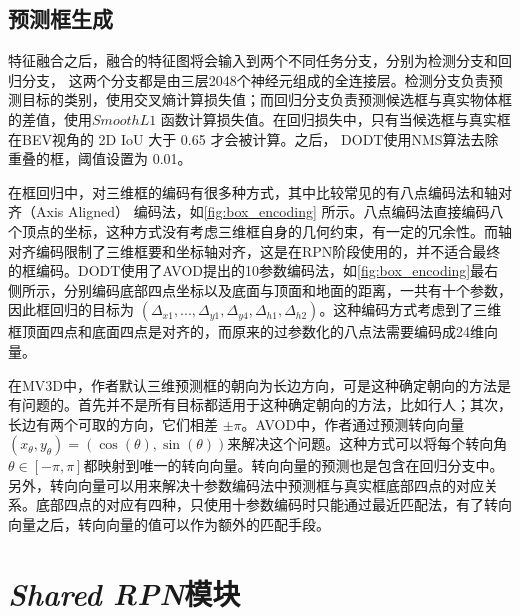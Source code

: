 \subsection{预测框生成}



特征融合之后，融合的特征图将会输入到两个不同任务分支，分别为检测分支和回归分支， 这两个分支都是由三层2048个神经元组成的全连接层。检测分支负责预测目标的类别，使用交叉熵计算损失值；而回归分支负责预测候选框与真实物体框的差值，使用$Smooth L1$ 函数计算损失值。在回归损失中，只有当候选框与真实框在BEV视角的 2D IoU 大于 0.65 才会被计算。之后， DODT使用NMS算法去除重叠的框，阈值设置为 0.01。

在框回归中，对三维框的编码有很多种方式，其中比较常见的有八点编码法和轴对齐（Axis Aligned） 编码法，如\figurename \ref{fig:box_encoding} 所示。八点编码法直接编码八个顶点的坐标，这种方式没有考虑三维框自身的几何约束，有一定的冗余性。而轴对齐编码限制了三维框要和坐标轴对齐，这是在RPN阶段使用的，并不适合最终的框编码。DODT使用了AVOD提出的10参数编码法，如\figurename \ref{fig:box_encoding}最右侧所示，分别编码底部四点坐标以及底面与顶面和地面的距离，一共有十个参数，因此框回归的目标为 $(\Delta_{x1}, ...,\Delta_{y1}, \Delta_{y4}, \Delta_{h1}, \Delta_{h2})$。这种编码方式考虑到了三维框顶面四点和底面四点是对齐的，而原来的过参数化的八点法需要编码成24维向量。

在MV3D中，作者默认三维预测框的朝向为长边方向，可是这种确定朝向的方法是有问题的。首先并不是所有目标都适用于这种确定朝向的方法，比如行人；其次，长边有两个可取的方向，它们相差 $\pm \pi$。AVOD中，作者通过预测转向向量 $(x_{\theta},y_{\theta}) = (\cos(\theta), \sin(\theta))$来解决这个问题。这种方式可以将每个转向角$\theta \in [-\pi, \pi]$都映射到唯一的转向向量。转向向量的预测也是包含在回归分支中。另外，转向向量可以用来解决十参数编码法中预测框与真实框底部四点的对应关系。底部四点的对应有四种，只使用十参数编码时只能通过最近匹配法，有了转向向量之后，转向向量的值可以作为额外的匹配手段。


\section{\textit{Shared RPN}模块}
\label{shared_rpn}



